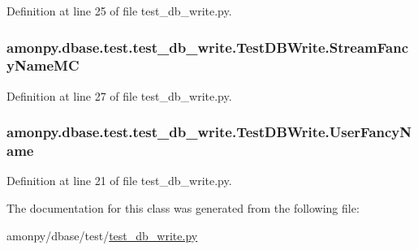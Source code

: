 Definition at line 25 of file test\-\_\-db\-\_\-write.\-py.

\hypertarget{classamonpy_1_1dbase_1_1test_1_1test__db__write_1_1_test_d_b_write_a2096a0b2fb2fe15fcb2894f1a7d61c68}{
\subsubsection[{Stream\-Fancy\-Name\-M\-C}]{\setlength{\rightskip}{0pt plus 5cm}amonpy.\-dbase.\-test.\-test\-\_\-db\-\_\-write.\-Test\-D\-B\-Write.\-Stream\-Fancy\-Name\-M\-C}}\label{classamonpy_1_1dbase_1_1test_1_1test__db__write_1_1_test_d_b_write_a2096a0b2fb2fe15fcb2894f1a7d61c68}


Definition at line 27 of file test\-\_\-db\-\_\-write.\-py.

\hypertarget{classamonpy_1_1dbase_1_1test_1_1test__db__write_1_1_test_d_b_write_ab23c3c078c9ef84ff80e595d0906cd83}{
\subsubsection[{User\-Fancy\-Name}]{\setlength{\rightskip}{0pt plus 5cm}amonpy.\-dbase.\-test.\-test\-\_\-db\-\_\-write.\-Test\-D\-B\-Write.\-User\-Fancy\-Name}}\label{classamonpy_1_1dbase_1_1test_1_1test__db__write_1_1_test_d_b_write_ab23c3c078c9ef84ff80e595d0906cd83}


Definition at line 21 of file test\-\_\-db\-\_\-write.\-py.



The documentation for this class was generated from the following file\-:\begin{DoxyCompactItemize}
\item 
amonpy/dbase/test/\hyperlink{test__db__write_8py}{test\-\_\-db\-\_\-write.\-py}\end{DoxyCompactItemize}
